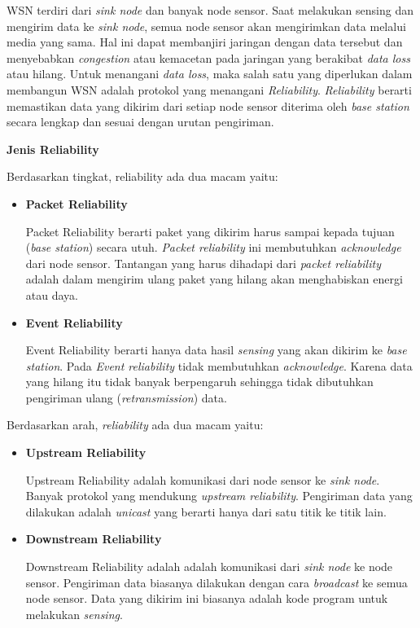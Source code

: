 \documentclass[a4paper,twoside]{article}
\begin{document}
\begin{enumerate}
WSN terdiri dari \textit{sink node} dan banyak node sensor. Saat melakukan sensing dan mengirim data ke \textit{sink node}, semua node sensor akan mengirimkan data melalui media yang sama. Hal ini dapat membanjiri jaringan dengan data tersebut dan menyebabkan \textit{congestion} atau kemacetan pada jaringan yang berakibat \textit{data loss} atau hilang. Untuk menangani \textit{data loss}, maka salah satu yang diperlukan dalam membangun WSN adalah protokol yang menangani \textit{Reliability}. \textit{Reliability} berarti memastikan data yang dikirim dari setiap node sensor diterima oleh \textit{base station} secara lengkap dan sesuai dengan urutan pengiriman.

\textbf{Jenis Reliability}

Berdasarkan tingkat, reliability ada dua macam yaitu:
\begin{itemize}
	\item \textbf{Packet Reliability}
	
	Packet Reliability berarti paket yang dikirim harus sampai kepada tujuan (\textit{base station}) secara utuh. \textit{Packet reliability} ini membutuhkan \textit{acknowledge} dari node sensor. Tantangan yang harus dihadapi dari \textit{packet reliability} adalah dalam mengirim ulang paket yang hilang akan menghabiskan energi atau daya.	
		
	\item \textbf{Event Reliability}
	
	Event Reliability berarti hanya data hasil \textit{sensing} yang akan dikirim ke \textit{base station}. Pada \textit{Event reliability} tidak membutuhkan \textit{acknowledge}. Karena data yang hilang itu tidak banyak berpengaruh sehingga tidak dibutuhkan pengiriman ulang (\textit{retransmission}) data.
	
\end{itemize} 

Berdasarkan arah, \textit{reliability} ada dua macam yaitu:
\begin{itemize}
	\item \textbf{Upstream Reliability}
	
Upstream Reliability adalah komunikasi dari node sensor ke \textit{sink node}. Banyak protokol yang mendukung \textit{upstream reliability}. Pengiriman data yang dilakukan adalah \textit{unicast} yang berarti hanya dari satu titik ke titik lain.	
	
	\item \textbf{Downstream Reliability}
	
	Downstream Reliability adalah adalah komunikasi dari \textit{sink node} ke node sensor. Pengiriman data biasanya dilakukan dengan cara \textit{broadcast} ke semua node sensor. Data yang dikirim ini biasanya adalah kode program untuk melakukan \textit{sensing}. 
\end{itemize}


\end{enumerate}
\end{document}
